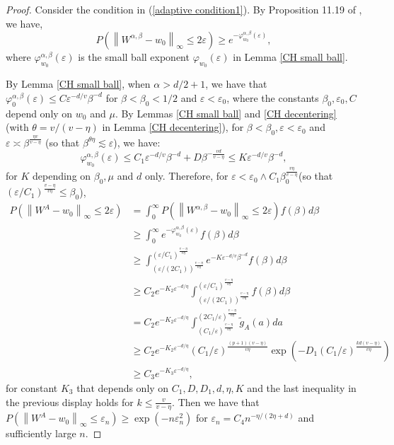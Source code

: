 \documentclass[ejs,noshowframe]{imsart}
\theoremstyle{plain}
\theoremstyle{definition}
\theoremstyle{remark}
\begin{document}
\begin{appendix}
\begin{proof}
Consider the condition in (\ref{adaptive condition1}).  By Proposition 11.19 of \cite{ghosal2017fundamentals}, we have, 
\begin{equation}
    P\left(\left\|W^{\alpha,\beta}-w_0\right\|_{\infty} \leq 2 \varepsilon\right) \geq e^{-\varphi_{w_0}^{\alpha,\beta}(\varepsilon)},
\end{equation}
where $\varphi_{w_0}^{\alpha,\beta}(\varepsilon)$ is the small ball exponent $\varphi_{w_0}(\varepsilon)$ in Lemma \ref{CH small ball}.

By Lemma \ref{CH small ball}, when $\alpha>d/2+1$, we have that $\varphi_0^{\alpha,\beta}(\varepsilon) \leq C  \varepsilon^{-d/v} \beta^{-d}$ for $\beta<\beta_0<1/2$ and $\varepsilon<\varepsilon_0$, where the constants $\beta_0, \varepsilon_0, C$ depend only on  $w_0$ and $\mu$. By Lemmas \ref{CH small ball} and \ref{CH decentering} (with $\theta=v/(v-\eta)$ in Lemma \ref{CH decentering}),  for $\beta  <\beta_0, \varepsilon<\varepsilon_0$ and $\varepsilon \asymp \beta^{\frac{\eta v}{v-\eta}}$ (so that $ \beta^{\theta \eta} \lesssim \varepsilon$), we have:
$$
\varphi_{w_0}^{\alpha,\beta}(\varepsilon) \leq C_1  \varepsilon^{-d/v} \beta^{-d} +
D \beta^{-\frac{vd}{v-\eta}}
\leq K \varepsilon^{-d/v} \beta^{-d},
$$
for $K$ depending on $\beta_0, \mu$ and $d$ only. Therefore, for $\varepsilon<\varepsilon_0 \wedge C_1 \beta_0^{\frac{v\eta}{v-\eta}}$(so that $ (\varepsilon/ C_1)^{\frac{v-\eta}{v\eta}} \le \beta_0$), 
$$
\begin{aligned}
P\left(\left\|W^A-w_0\right\|_{\infty} \leq 2 \varepsilon\right)&= \int_0^{\infty} P\left(\left\|W^{\alpha,\beta}-w_0\right\|_{\infty} \leq 2 \varepsilon\right) f({\beta}) d {\beta} \\
& \geq \int_0^{\infty} e^{-\varphi_{w_0}^{\alpha,\beta}(\varepsilon)} f({\beta}) d {\beta} \\
& \geq \int_{(\varepsilon/(2 C_1))^{\frac{v-\eta}{v\eta}}}^{(  \varepsilon/C_1)^{\frac{v-\eta}{v\eta}}} e^{-K \varepsilon^{-d/v} \beta^{-d}}f({\beta}) d {\beta}  \\
& \geq C_2 e^{-K_2 \varepsilon^{-d/\eta}}  \int_{(\varepsilon/(2 C_1))^{\frac{v-\eta}{v\eta}}}^{(  \varepsilon/C_1)^{\frac{v-\eta}{v\eta}}}f({\beta}) d {\beta}\\
&= C_2 e^{-K_2 \varepsilon^{-d/\eta}}  \int_{(C_1/\varepsilon )^{\frac{v-\eta}{v\eta}}}^{(  2C_1/\varepsilon)^{\frac{v-\eta}{v\eta}}}\tilde{g}_A({a}) d {a}\\
& \ge C_2 e^{-K_2 \varepsilon^{-d/\eta}} (C_1/\varepsilon)^{\frac{(p+1)(v-\eta)}{v\eta}} \exp{(-D_1(C_1/\varepsilon)^{\frac{kd(v-\eta)}{v\eta}})}\\
& \geq C_3 e^{-K_3 \varepsilon^{-d/\eta}},
\end{aligned}
$$
for constant $K_3$ that depends only on $C_1, D, D_1, d, \eta,K$ and the last inequality in the previous display holds for $k \leq \frac{v}{v-\eta}$. Then we have that \\$P\left(\left\|W^A-w_0\right\|_{\infty} \leq \varepsilon_n\right) \geq \exp \left(-n \varepsilon_n^2\right)$ for $\varepsilon_n=C_4 n^{-\eta /(2\eta+d )}$ and sufficiently large $n$.


\end{proof}
\end{appendix}
\end{document}
